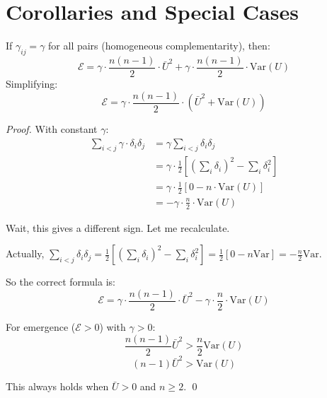 \section{Corollaries and Special Cases}
\label{sec:let-corollaries}

\begin{corollary}
\label{cor:homogeneous}
If $\gamma_{ij} = \gamma$ for all pairs (homogeneous complementarity), then:
\begin{equation}
\mathcal{E} = \gamma \cdot \frac{n(n-1)}{2} \cdot \bar{U}^2 + \gamma \cdot \frac{n(n-1)}{2} \cdot \text{Var}(U)
\end{equation}
Simplifying:
\begin{equation}
\boxed{\mathcal{E} = \gamma \cdot \frac{n(n-1)}{2} \cdot \left( \bar{U}^2 + \text{Var}(U) \right)}
\label{eq:homogeneous-emergence}
\end{equation}
\end{corollary}

\begin{proof}
With constant $\gamma$:
\begin{align}
\sum_{i<j} \gamma \cdot \delta_i \delta_j &= \gamma \sum_{i<j} \delta_i \delta_j \\
&= \gamma \cdot \frac{1}{2} \left[ \left(\sum_i \delta_i\right)^2 - \sum_i \delta_i^2 \right] \\
&= \gamma \cdot \frac{1}{2} \left[ 0 - n \cdot \text{Var}(U) \right] \\
&= -\gamma \cdot \frac{n}{2} \cdot \text{Var}(U)
\end{align}

Wait, this gives a different sign. Let me recalculate.

Actually, $\sum_{i<j} \delta_i \delta_j = \frac{1}{2}\left[(\sum_i \delta_i)^2 - \sum_i \delta_i^2\right] = \frac{1}{2}[0 - n\text{Var}] = -\frac{n}{2}\text{Var}$.

So the correct formula is:
\begin{equation}
\mathcal{E} = \gamma \cdot \frac{n(n-1)}{2} \cdot \bar{U}^2 - \gamma \cdot \frac{n}{2} \cdot \text{Var}(U)
\end{equation}

For emergence ($\mathcal{E} > 0$) with $\gamma > 0$:
\begin{equation}
\frac{n(n-1)}{2} \bar{U}^2 > \frac{n}{2} \text{Var}(U)
\end{equation}
\begin{equation}
(n-1) \bar{U}^2 > \text{Var}(U)
\end{equation}

This always holds when $\bar{U} > 0$ and $n \geq 2$. \qed
\end{proof}

